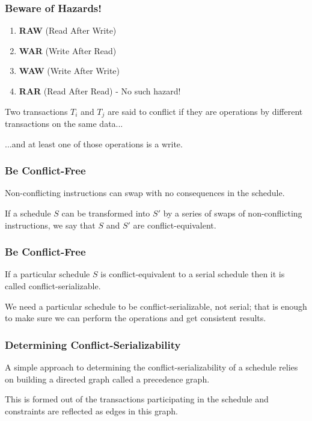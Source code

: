 \begin{frame}
\frametitle{Beware of Hazards!}

\begin{enumerate}
	\item \textbf{RAW} (Read After Write)
	\item \textbf{WAR} (Write After Read)
	\item \textbf{WAW} (Write After Write)
	\item \textbf{RAR} (Read After Read) - No such hazard! 
\end{enumerate}

Two transactions $T_{i}$ and $T_{j}$ are said to \alert{conflict} if they are operations by different transactions on the same data... 

...and at least one of those operations is a write.

\end{frame}

\begin{frame}
\frametitle{Be Conflict-Free}

Non-conflicting instructions can swap with no consequences in the schedule. 

If a schedule $S$ can be transformed into $S'$ by a series of swaps of non-conflicting instructions, we say that $S$ and $S'$ are conflict-equivalent.

\end{frame}

\begin{frame}
\frametitle{Be Conflict-Free}

If a particular schedule $S$ is conflict-equivalent to a serial schedule then it is called conflict-serializable.

We need a particular schedule to be conflict-serializable, not serial; that is enough to make sure we can perform the operations and get consistent results.

\end{frame}

\begin{frame}
\frametitle{Determining Conflict-Serializability}

A simple approach to determining the conflict-serializability of a schedule relies on building a directed graph called a precedence graph. 

This is formed out of the transactions participating in the schedule and constraints are reflected as edges in this graph. 

\end{frame}

